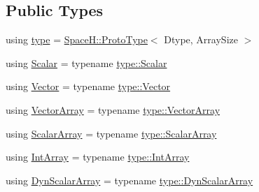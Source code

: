 \subsection*{Public Types}
\begin{DoxyCompactItemize}
\item 
using \mbox{\hyperlink{class_vel_indep_particles_a0c62b43c2f0a50565e5e06587fddee18}{type}} = \mbox{\hyperlink{struct_space_h_1_1_proto_type}{Space\+H\+::\+Proto\+Type}}$<$ Dtype, Array\+Size $>$
\item 
using \mbox{\hyperlink{class_vel_indep_particles_a5d275b22f0d759f360ddd80e78f4b466}{Scalar}} = typename \mbox{\hyperlink{struct_space_h_1_1_proto_type_af3c8245d83d9db64749882920de5c274}{type\+::\+Scalar}}
\item 
using \mbox{\hyperlink{class_vel_indep_particles_aa7e03da81f44941c06abf43ec2180079}{Vector}} = typename \mbox{\hyperlink{struct_space_h_1_1_proto_type_a316b81f4660b2b4fab14a8e1f23b6089}{type\+::\+Vector}}
\item 
using \mbox{\hyperlink{class_vel_indep_particles_a27580f65b6523bfb6900520af2e44708}{Vector\+Array}} = typename \mbox{\hyperlink{struct_space_h_1_1_proto_type_a622b8e122b33bb4966a02299fb7b82d6}{type\+::\+Vector\+Array}}
\item 
using \mbox{\hyperlink{class_vel_indep_particles_abd6e6b0ffbbab4ebc078efd77f6a365a}{Scalar\+Array}} = typename \mbox{\hyperlink{struct_space_h_1_1_proto_type_a09ef91dc8a37a044c403f5a833044725}{type\+::\+Scalar\+Array}}
\item 
using \mbox{\hyperlink{class_vel_indep_particles_a5e4f20d435c71a5f4179143206258a81}{Int\+Array}} = typename \mbox{\hyperlink{struct_space_h_1_1_proto_type_ad9105b93d029a9d231bc31ddcfd7dbd9}{type\+::\+Int\+Array}}
\item 
using \mbox{\hyperlink{class_vel_indep_particles_a6bba8ac3f941a144214037a27ccaa119}{Dyn\+Scalar\+Array}} = typename \mbox{\hyperlink{struct_space_h_1_1_proto_type_a8f3813f576517856e0ed74af9e5ffcb4}{type\+::\+Dyn\+Scalar\+Array}}
\end{DoxyCompactItemize}
